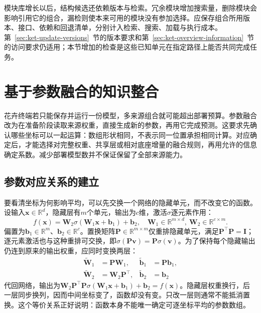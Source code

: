 模块库增长以后，结构候选还依赖版本与检索。冗余模块增加搜索量，删除模块会影响引用它的组合，漏检则使本来可用的模块没有参加选择。应保存组合所用版本、接口、依赖和回退清单，分别计入检索、搜索、加载与执行成本。第~\ref{sec:ket-update-versions}~节的版本要求和第~\ref{sec:ket-overview-information}~节的访问要求仍适用；本节增加的检查是这些已知单元在指定路径上能否共同完成任务。

\section{基于参数融合的知识整合}
\label{sec:ket-integration-merging}

花卉终端若只能保存并运行一份模型，多来源组合就可能超出部署预算。参数融合改为在准备阶段读取来源权重，直接生成新的参数，再用它完成预测。这要求先确认哪些坐标可以一起运算：数组形状相同，不表示同一位置承担相同计算。对应确定后，才能选择对完整权重、共享层或相对底座增量的融合规则，再用允许的信息确定系数。减少部署模型数并不保证保留了全部来源能力。

\subsection{参数对应关系的建立}
\label{sec:ket-integration-alignment}

要看清坐标为何影响平均，可以先交换一个网络的隐藏单元，而不改变它的函数。设输入$\bm{x}\in\mathbb{R}^d$，隐藏层有$m$个单元，输出为$c$维，激活$\sigma$逐元素作用：
\[
  f(\bm{x})=\bm{W}_2\sigma(\bm{W}_1\bm{x}+\bm{b}_1)+\bm{b}_2,
  \quad \bm{W}_1\in\mathbb{R}^{m\times d},\
  \bm{W}_2\in\mathbb{R}^{c\times m}.
\]
偏置为$\bm{b}_1\in\mathbb{R}^m$、$\bm{b}_2\in\mathbb{R}^c$。置换矩阵$\bm{P}\in\mathbb{R}^{m\times m}$仅重排隐藏单元，满足$\bm{P}^{\top}\bm{P}=\bm{I}$；逐元素激活也与这种重排可交换，即$\sigma(\bm{P}\bm{v})=\bm{P}\sigma(\bm{v})$。为了保持每个隐藏输出仍连到原来的输出权重，应同时变换两层：
\begin{equation}
  \begin{aligned}
    \widetilde{\bm{W}}_1&=\bm{P}\bm{W}_1,&
    \widetilde{\bm{b}}_1&=\bm{P}\bm{b}_1,\\
    \widetilde{\bm{W}}_2&=\bm{W}_2\bm{P}^{\top},&
    \widetilde{\bm{b}}_2&=\bm{b}_2
  \end{aligned}
  \label{eq:ket-integration-permutation}
\end{equation}
代回网络，输出为$\bm{W}_2\bm{P}^{\top}\bm{P}\sigma(\bm{W}_1\bm{x}+\bm{b}_1)+\bm{b}_2=f(\bm{x})$。隐藏层权重换行，后一层同步换列，因而中间坐标变了，函数却没有变。只改一层则通常不能抵消置换。这个等价关系正好说明：函数本身不能唯一确定可逐坐标平均的参数数组。

